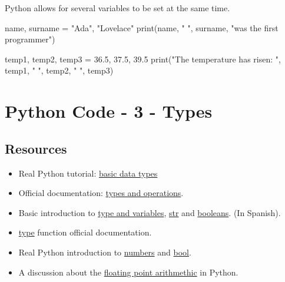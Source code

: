 \documentclass[
  letterpaper,
  DIV=11,
  numbers=noendperiod]{scrreprt}
\newenvironment{Shaded}{\begin{snugshade}}{\end{snugshade}}
\newcommand{\NormalTok}[1]{\textcolor[rgb]{0.00,0.23,0.31}{#1}}
\providecommand{\tightlist}{%
  \setlength{\itemsep}{0pt}\setlength{\parskip}{0pt}}\usepackage{longtable,booktabs,array}
\theoremstyle{remark}
\begin{document}
Python allows for several variables to be set at the same time.

\begin{Shaded}
\begin{Highlighting}[]

\NormalTok{name, surname = "Ada", "Lovelace"}
\NormalTok{print(name, " ", surname, "was the first programmer")}

\NormalTok{temp1, temp2, temp3 = 36.5, 37.5, 39.5}
\NormalTok{print("The temperature has risen: ", temp1, " ", temp2, " ", temp3)}
\end{Highlighting}
\end{Shaded}


\chapter{Python Code - 3 - Types}\label{python-code---3---types}

\section{Resources}\label{resources-1}

\begin{itemize}
\tightlist
\item
  Real Python tutorial:
  \href{https://realpython.com/python-data-types/}{basic data types}
\item
  Official documentation:
  \href{https://docs.python.org/3/library/stdtypes.html}{types and
  operations}.
\item
  Basic introduction to
  \href{https://github.com/JoseBlanca/py_industriales/blob/main/python/tipos_y_variables.ipynb}{type
  and variables},
  \href{https://github.com/JoseBlanca/py_industriales/blob/main/python/cadenas_de_texto.ipynb}{str}
  and
  \href{https://github.com/JoseBlanca/py_industriales/blob/main/python/booleanos.ipynb}{booleans}.
  (In Spanish).
\item
  \href{https://docs.python.org/3/library/functions.html\#type}{type}
  function official documentation.
\item
  Real Python introduction to
  \href{https://realpython.com/python-numbers/}{numbers} and
  \href{https://realpython.com/python-boolean/}{bool}.
\item
  A discussion about the
  \href{https://docs.python.org/3/tutorial/floatingpoint.html}{floating
  point arithmethic} in Python.
\end{itemize}
\end{document}

